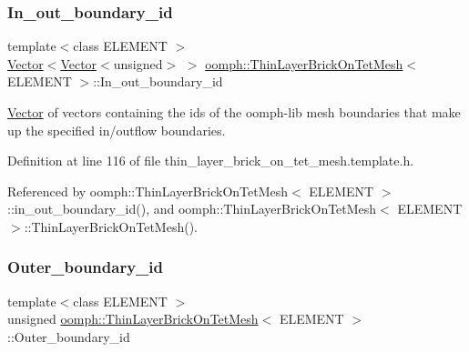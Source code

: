 \mbox{\label{classoomph_1_1ThinLayerBrickOnTetMesh_aa8990092c886c1f5ac89b4476bf75b39}} 
\subsubsection{\texorpdfstring{In\+\_\+out\+\_\+boundary\+\_\+id}{In\_out\_boundary\_id}}
{\footnotesize\ttfamily template$<$class E\+L\+E\+M\+E\+NT $>$ \\
\hyperlink{classoomph_1_1Vector}{Vector}$<$\hyperlink{classoomph_1_1Vector}{Vector}$<$unsigned$>$ $>$ \hyperlink{classoomph_1_1ThinLayerBrickOnTetMesh}{oomph\+::\+Thin\+Layer\+Brick\+On\+Tet\+Mesh}$<$ E\+L\+E\+M\+E\+NT $>$\+::In\+\_\+out\+\_\+boundary\+\_\+id\hspace{0.3cm}{\ttfamily [private]}}



\hyperlink{classoomph_1_1Vector}{Vector} of vectors containing the ids of the oomph-\/lib mesh boundaries that make up the specified in/outflow boundaries. 



Definition at line 116 of file thin\+\_\+layer\+\_\+brick\+\_\+on\+\_\+tet\+\_\+mesh.\+template.\+h.



Referenced by oomph\+::\+Thin\+Layer\+Brick\+On\+Tet\+Mesh$<$ E\+L\+E\+M\+E\+N\+T $>$\+::in\+\_\+out\+\_\+boundary\+\_\+id(), and oomph\+::\+Thin\+Layer\+Brick\+On\+Tet\+Mesh$<$ E\+L\+E\+M\+E\+N\+T $>$\+::\+Thin\+Layer\+Brick\+On\+Tet\+Mesh().

\mbox{\label{classoomph_1_1ThinLayerBrickOnTetMesh_a93acb15ee2a6fd52a21c31830b2a984b}} 
\subsubsection{\texorpdfstring{Outer\+\_\+boundary\+\_\+id}{Outer\_boundary\_id}}
{\footnotesize\ttfamily template$<$class E\+L\+E\+M\+E\+NT $>$ \\
unsigned \hyperlink{classoomph_1_1ThinLayerBrickOnTetMesh}{oomph\+::\+Thin\+Layer\+Brick\+On\+Tet\+Mesh}$<$ E\+L\+E\+M\+E\+NT $>$\+::Outer\+\_\+boundary\+\_\+id\hspace{0.3cm}{\ttfamily [private]}}



